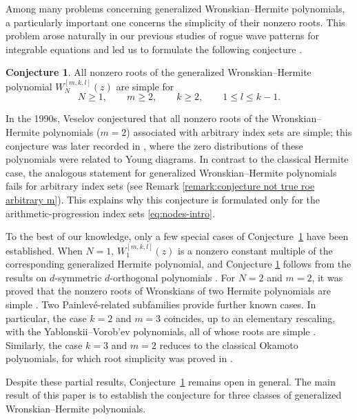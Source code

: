 \documentclass[preprint,3p,10pt]{elsarticle}
\theoremstyle{definition}
\newtheorem{conjecture}{Conjecture}
\begin{document}
Among many problems concerning generalized
Wronskian--Hermite polynomials, a particularly important one concerns the
simplicity of their nonzero roots. This problem arose naturally in our
previous studies of rogue wave patterns for integrable equations and led us
to formulate the following conjecture
\cite{yang2023rogue,zhang2022rogue}.

\begin{conjecture}\label{conjecture:nonzero simple of WH}
All nonzero roots of the generalized Wronskian--Hermite polynomial \(W_N^{[m,k,l]}(z)\) are simple for 
\begin{equation}
    N\ge1,\qquad m\ge2,\qquad k\ge2,\qquad 1\le l\le k-1.
\end{equation}
\end{conjecture}

In the 1990s, Veselov conjectured that all nonzero roots of the Wronskian--Hermite polynomials ($m=2$) associated with arbitrary index sets are simple; this conjecture was later recorded in \cite{felder2012zeros}, where the zero distributions of these polynomials were related to Young diagrams.
In contrast to the classical Hermite case,
the analogous statement for generalized Wronskian--Hermite polynomials
fails for arbitrary index sets (see Remark \ref{remark:conjecture not true roe arbitrary m}). This explains why this conjecture is formulated only for the arithmetic-progression index sets \eqref{eq:nodes-intro}.

To the best of our knowledge, only a few special cases of
Conjecture~\ref{conjecture:nonzero simple of WH} have been established. When
\(N=1\), \(W_1^{[m,k,l]}(z)\) is a nonzero constant multiple of the corresponding generalized Hermite polynomial, and Conjecture \ref{conjecture:nonzero simple of WH} follows from the results on
\(d\)-symmetric \(d\)-orthogonal polynomials \cite{romdhane2008zeros}. For
\(N=2\) and \(m=2\), it was proved that the
nonzero roots of Wronskians of two Hermite polynomials are simple
\cite{garcia2015oscillation}. Two Painlev\'{e}-related subfamilies provide further known cases. In particular, the case \(k=2\) and \(m=3\) coincides, up to an
elementary rescaling, with the Yablonskii--Vorob'ev polynomials, all of whose roots are
simple \cite{fukutani2000special}. Similarly, the case \(k=3\) and \(m=2\)
reduces to the classical Okamoto polynomials, for which root simplicity was
proved in \cite{kametaka1983poles,fukutani2000special}. 


Despite these partial results,
Conjecture~\ref{conjecture:nonzero simple of WH} remains open in general.
The main result of this paper is to establish the conjecture for three classes of generalized Wronskian--Hermite polynomials.
\end{document}
